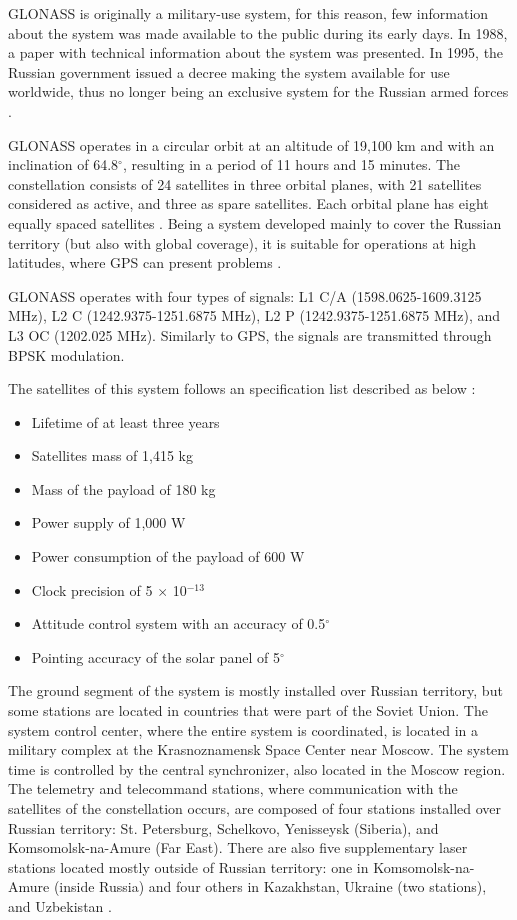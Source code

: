 GLONASS is originally a military-use system, for this reason, few information about the system was made available to the public during its early days. In 1988, a paper with technical information about the system was presented. In 1995, the Russian government issued a decree making the system available for use worldwide, thus no longer being an exclusive system for the Russian armed forces \cite{hofmann-wellenhof2007}.

GLONASS operates in a circular orbit at an altitude of 19,100 km and with an inclination of 64.8$^\circ$, resulting in a period of 11 hours and 15 minutes. The constellation consists of 24 satellites in three orbital planes, with 21 satellites considered as active, and three as spare satellites. Each orbital plane has eight equally spaced satellites \cite{hofmann-wellenhof2007}. Being a system developed mainly to cover the Russian territory (but also with global coverage), it is suitable for operations at high latitudes, where GPS can present problems \cite{polischuk2002}.

GLONASS operates with four types of signals: L1 C/A (1598.0625-1609.3125 MHz), L2 C (1242.9375-1251.6875 MHz), L2 P (1242.9375-1251.6875 MHz), and L3 OC (1202.025 MHz). Similarly to GPS, the signals are transmitted through BPSK modulation.

The satellites of this system follows an specification list described as below \cite{hofmann-wellenhof2007}:

\begin{itemize}
    \item Lifetime of at least three years
    \item Satellites mass of 1,415 kg
    \item Mass of the payload of 180 kg
    \item Power supply of 1,000 W
    \item Power consumption of the payload of 600 W
    \item Clock precision of 5 $\times$ 10$^{-13}$
    \item Attitude control system with an accuracy of 0.5$^{\circ}$
    \item Pointing accuracy of the solar panel of 5$^{\circ}$
\end{itemize}

The ground segment of the system is mostly installed over Russian territory, but some stations are located in countries that were part of the Soviet Union. The system control center, where the entire system is coordinated, is located in a military complex at the Krasnoznamensk Space Center near Moscow. The system time is controlled by the central synchronizer, also located in the Moscow region. The telemetry and telecommand stations, where communication with the satellites of the constellation occurs, are composed of four stations installed over Russian territory: St. Petersburg, Schelkovo, Yenisseysk (Siberia), and Komsomolsk-na-Amure (Far East). There are also five supplementary laser stations located mostly outside of Russian territory: one in Komsomolsk-na-Amure (inside Russia) and four others in Kazakhstan, Ukraine (two stations), and Uzbekistan \cite{hofmann-wellenhof2007}.

